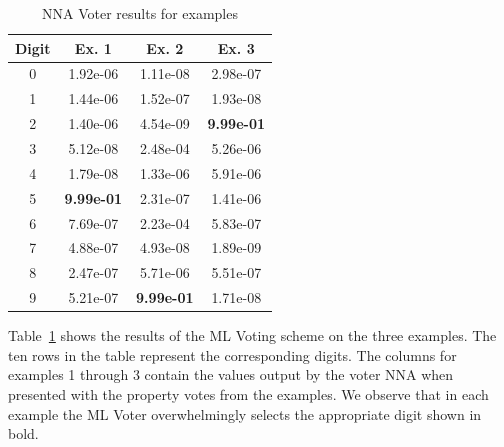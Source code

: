 \documentclass[conference]{IEEEtran}
\begin{document}
\begin{table}[htbp]
\caption{NNA Voter results for examples}
\centering
\begin{tabular}{| c | c | c | c |}
\hline
 Digit & Ex. 1 & Ex. 2 & Ex. 3 \\
\hline\hline
0 & 1.92e-06 & 1.11e-08 & 2.98e-07\\ 
\hline
1 & 1.44e-06 & 1.52e-07 & 1.93e-08 \\
\hline
2 & 1.40e-06 & 4.54e-09 & \textbf{9.99e-01} \\
\hline
3 & 5.12e-08 & 2.48e-04 & 5.26e-06 \\
\hline
4 & 1.79e-08 & 1.33e-06 & 5.91e-06 \\
\hline
5 & \textbf{9.99e-01} & 2.31e-07 & 1.41e-06 \\
\hline
6 & 7.69e-07 & 2.23e-04 & 5.83e-07 \\
\hline
7 & 4.88e-07 & 4.93e-08 & 1.89e-09 \\
\hline
8 & 2.47e-07 & 5.71e-06 & 5.51e-07 \\
\hline
9 & 5.21e-07 & \textbf{9.99e-01} & 1.71e-08 \\
\hline
\end{tabular}
\label{table:nnavoter}
\end{table}

Table~\ref{table:nnavoter} shows the results of the ML Voting scheme on the three examples.  The ten rows in the table represent the corresponding digits.  The columns for examples 1 through 3 contain the values output by the voter NNA when presented with the property votes from the examples.  We observe that in each example the ML Voter overwhelmingly selects the appropriate digit shown in bold.
\end{document}
